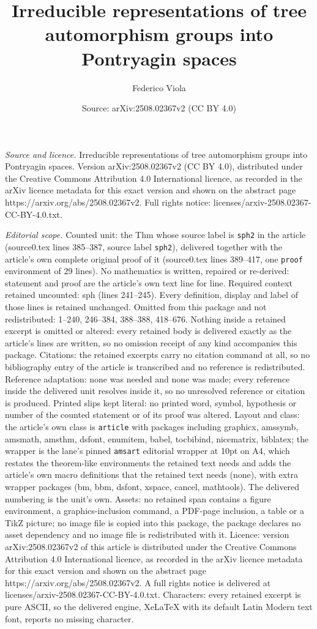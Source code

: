 \documentclass[10pt,a4paper]{amsart}
\title[Irreducible representations of tree automorphism groups into]{Irreducible representations of tree automorphism groups into Pontryagin spaces}
\author{Federico Viola}
\date{Source: arXiv:2508.02367v2 (CC BY 4.0)}
\begin{document}
\maketitle

\noindent\emph{Source and licence.} Irreducible representations of tree automorphism groups into Pontryagin spaces. Version arXiv:2508.02367v2 (CC BY 4.0), distributed under the Creative Commons Attribution 4.0 International licence, as recorded in the arXiv licence metadata for this exact version and shown on the abstract page https://arxiv.org/abs/2508.02367v2. Full rights notice: licenses/arxiv-2508.02367-CC-BY-4.0.txt.\par\smallskip

\noindent\textit{Editorial scope.} Counted unit: the Thm whose source label is \texttt{sph2} in the article (source0.tex lines 385--387, source label \texttt{sph2}), delivered together with the article's own complete original proof of it (source0.tex lines 389--417, one \texttt{proof} environment of 29 lines). No mathematics is written, repaired or re-derived: statement and proof are the article's own text line for line. Required context retained uncounted: sph (lines 241--245). Every definition, display and label of those lines is retained unchanged. Omitted from this package and not redistributed: 1--240, 246--384, 388--388, 418--676. Nothing inside a retained excerpt is omitted or altered: every retained body is delivered exactly as the article's lines are written, so no omission receipt of any kind accompanies this package. Citations: the retained excerpts carry no citation command at all, so no bibliography entry of the article is transcribed and no reference is redistributed. Reference adaptation: none was needed and none was made; every reference inside the delivered unit resolves inside it, so no unresolved reference or citation is produced. Printed slips kept literal: no printed word, symbol, hypothesis or number of the counted statement or of its proof was altered. Layout and class: the article's own class is \texttt{article} with packages including graphicx, amssymb, amsmath, amsthm, dsfont, enumitem, babel, tocbibind, nicematrix, biblatex; the wrapper is the lane's pinned \texttt{amsart} editorial wrapper at 10pt on A4, which restates the theorem-like environments the retained text needs and adds the article's own macro definitions that the retained text needs (none), with extra wrapper packages (bm, bbm, dsfont, xspace, cancel, mathtools). The delivered numbering is the unit's own. Assets: no retained span contains a figure environment, a graphics-inclusion command, a PDF-page inclusion, a table or a TikZ picture; no image file is copied into this package, the package declares no asset dependency and no image file is redistributed with it. Licence: version arXiv:2508.02367v2 of this article is distributed under the Creative Commons Attribution 4.0 International licence, as recorded in the arXiv licence metadata for this exact version and shown on the abstract page https://arxiv.org/abs/2508.02367v2. A full rights notice is delivered at licenses/arxiv-2508.02367-CC-BY-4.0.txt. Characters: every retained excerpt is pure ASCII, so the delivered engine, XeLaTeX with its default Latin Modern text font, reports no missing character.
\end{document}
